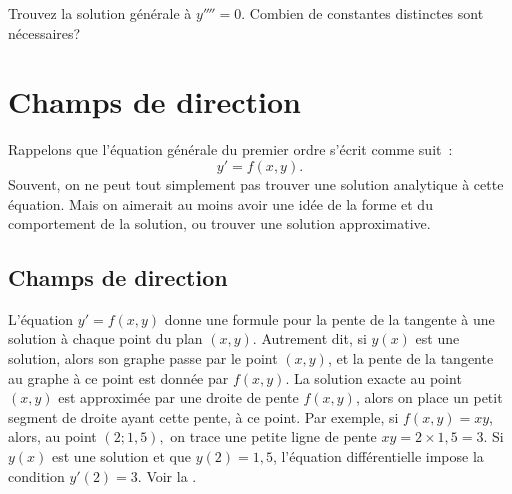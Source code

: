 \begin{exercise}
Trouvez la solution générale à $y''''= 0$.  Combien de constantes distinctes sont nécessaires?
\end{exercise}


\sectionnewpage
\section{Champs de direction}
\label{slopefields:section}


%

Rappelons que l'équation générale du premier ordre s'écrit comme suit \,: 
\begin{equation*}
y' = f(x,y).
\end{equation*}
Souvent, on ne peut tout simplement pas trouver une solution analytique à cette équation.  Mais on aimerait au moins avoir une idée de la forme et du comportement de la solution, ou trouver une solution approximative.

\subsection{Champs de direction}

L'équation $y' = f(x,y)$ donne une formule pour la pente de la tangente à une solution à chaque point du plan $(x,y)$. Autrement dit, si $y(x)$ est une solution, alors son graphe passe par le point $(x,y)$, et la pente de la tangente au graphe à ce point est donnée par $f(x,y)$. La solution exacte au point $(x,y)$ est approximée par une droite de pente $f(x,y)$, alors on place un petit segment de droite ayant cette pente, à ce point.
%
Par exemple, si $f(x,y)=xy$, alors, au point $(2;1,5),$ on trace une petite ligne de pente $xy = 2 \times 1,5 = 3$.  Si $y(x)$ est une solution et que $y(2) = 1,5$, l'équation différentielle impose la condition $y'(2) = 3$.
Voir la .

